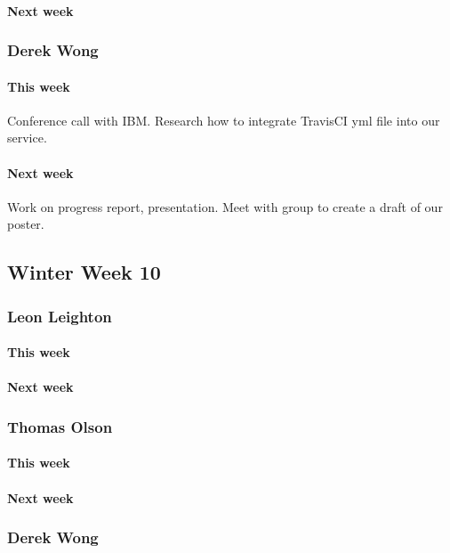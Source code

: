 \documentclass[10pt,letterpaper,onecolumn,draftclsnofoot]{IEEEtran}
\begin{document}
\paragraph{Next week}


\subsubsection{Derek Wong}
\paragraph{This week}Conference call with IBM\@.
Research how to integrate TravisCI yml file into our service.

\paragraph{Next week}Work on progress report, presentation.            
Meet with group to create a draft of our poster.

\subsection{Winter Week 10}
\subsubsection{Leon Leighton}
\paragraph{This week}
\paragraph{Next week}


\subsubsection{Thomas Olson}
\paragraph{This week}
\paragraph{Next week}


\subsubsection{Derek Wong}
\end{document}
